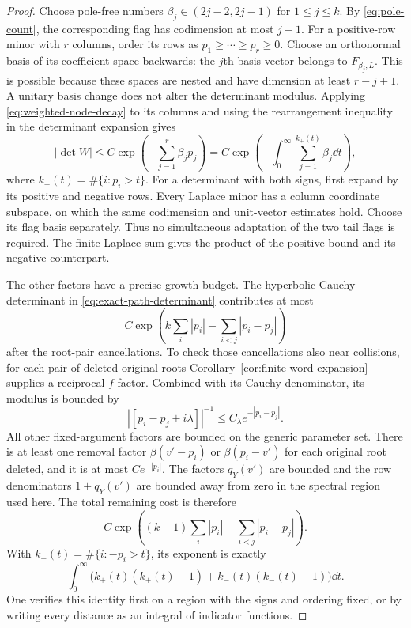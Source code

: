 \begin{proof}
Choose pole-free numbers
$\beta_j\in(2j-2,2j-1)$ for $1\le j\le k$.
By \eqref{eq:pole-count}, the corresponding flag has
codimension at most $j-1$.
For a positive-row minor with $r$ columns, order its rows as
$p_1\ge\cdots\ge p_r\ge0$.
Choose an orthonormal basis of its coefficient space backwards:
the $j$th basis vector belongs to $F_{\beta_j,L}$.
This is possible because these spaces are nested and have
dimension at least $r-j+1$.  A unitary basis change does not alter
the determinant modulus.  Applying
\eqref{eq:weighted-node-decay} to its columns and using the
rearrangement inequality in the determinant expansion gives
\begin{equation}\label{eq:positive-minor-bound}
 |\det W|\le C\exp\left(-\sum_{j=1}^r\beta_jp_j\right)
   =C\exp\left(-\int_0^\infty
                \sum_{j=1}^{k_+(t)}\beta_j\dd t\right),
\end{equation}
where $k_+(t)=\#\{i:p_i>t\}$.
For a determinant with both signs, first expand by its positive
and negative rows.  Every Laplace minor has a column coordinate
subspace, on which the same codimension and unit-vector estimates
hold.  Choose its flag basis separately.  Thus no simultaneous
adaptation of the two tail flags is required.  The finite Laplace
sum gives the product of the positive bound and its negative
counterpart.

The other factors have a precise growth budget.
The hyperbolic Cauchy determinant in
\eqref{eq:exact-path-determinant} contributes at most
\[
 C\exp\left(k\sum_i|p_i|-\sum_{i<j}|p_i-p_j|\right)
\]
after the root-pair cancellations.  To check those cancellations
also near collisions, for each pair of deleted original roots
Corollary~\ref{cor:finite-word-expansion} supplies a reciprocal
$f$ factor.  Combined with its Cauchy denominator, its modulus
is bounded by
\[
 |[p_i-p_j\pm i\lambda]|^{-1}
       \le C_\lambda e^{-|p_i-p_j|}.
\]
All other fixed-argument factors are bounded on the generic
parameter set.  There is at least one removal factor
$\beta(v'-p_i)$ or $\beta(p_i-v')$ for each original root
deleted, and it is at most $Ce^{-|p_i|}$.
The factors $q_Y(v')$ are bounded and the row denominators
$1+q_Y(v')$ are bounded away from zero in the spectral region
used here.  The total remaining cost is therefore
\[
 C\exp\left((k-1)\sum_i|p_i|
                         -\sum_{i<j}|p_i-p_j|\right).
\]
With $k_-(t)=\#\{i:-p_i>t\}$, its exponent is exactly
\begin{equation}\label{eq:Cauchy-tail-cost}
 \int_0^\infty
 \bigl(k_+(t)(k_+(t)-1)+k_-(t)(k_-(t)-1)\bigr)\dd t.
\end{equation}
One verifies this identity first on a region with the signs and
ordering fixed, or by writing every distance as an integral of
indicator functions.


\end{proof}
